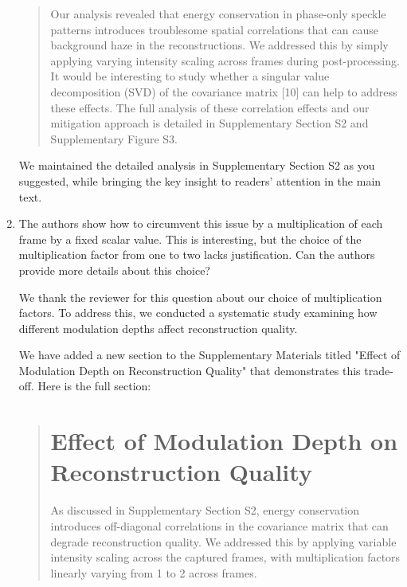 \documentclass[12pt]{article}
\newenvironment{solved_reviewercomment}
    {\begin{tcolorbox}[width=\linewidth,colback=gray!5,colframe=solved_commentcolor!50,title=Reviewer Comment,left=5pt,right=5pt]}
    {\end{tcolorbox}}
\newenvironment{ourresponse}
    {\begin{tcolorbox}[width=\linewidth,breakable,enhanced,colback=gray!5,colframe=responsecolor!50,title=Response,left=5pt,right=5pt]}
    {\end{tcolorbox}}
\begin{document}
\begin{enumerate}[label=\arabic*.]
\begin{ourresponse}
\begin{quote}
            Our analysis revealed that energy conservation in phase-only speckle patterns introduces troublesome spatial correlations that can cause background haze in the reconstructions. We addressed this by simply applying varying intensity scaling across frames during post-processing. It would be interesting to study whether a singular value decomposition (SVD) of the covariance matrix [10] can help to address these effects. The full analysis of these correlation effects and our mitigation approach is detailed in Supplementary Section S2 and Supplementary Figure S3.
        \end{quote}
        
        We maintained the detailed analysis in Supplementary Section S2 as you suggested, while bringing the key insight to readers' attention in the main text.

    \end{ourresponse}
    
    \item \leavevmode\vspace{-\baselineskip}
    \begin{solved_reviewercomment}
        The authors show how to circumvent this issue by a multiplication of each frame by a fixed scalar value. This is interesting, but the choice of the multiplication factor from one to two lacks justification. Can the authors provide more details about this choice? 
    \end{solved_reviewercomment}

\begin{ourresponse}
We thank the reviewer for this question about our choice of multiplication factors. To address this, we conducted a systematic study examining how different modulation depths affect reconstruction quality.

We have added a new section to the Supplementary Materials titled "Effect of Modulation Depth on Reconstruction Quality" that demonstrates this trade-off. Here is the full section:

\begin{quote}
\section{Effect of Modulation Depth on Reconstruction Quality}

As discussed in Supplementary Section S2, energy conservation introduces off-diagonal correlations in the covariance matrix that can degrade reconstruction quality. We addressed this by applying variable intensity scaling across the captured frames, with multiplication factors linearly varying from 1 to 2 across frames.


\end{quote}
\end{ourresponse}
\end{enumerate}
\end{document}
